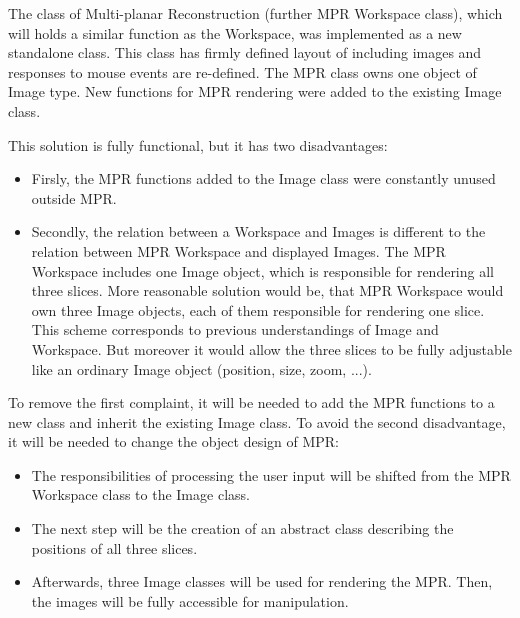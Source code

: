 The class of Multi-planar Reconstruction (further MPR Workspace class), which will holds a similar function as the Workspace, was implemented as a new standalone class. This class has firmly defined layout of including images and responses to mouse events are re-defined. The MPR class owns one object of Image type. New functions for MPR rendering were added to the existing Image class.

This solution is fully functional, but it has two disadvantages:

\begin{itemize}
\item Firsly, the MPR functions added to the Image class were constantly unused outside MPR.
\item Secondly, the relation between a Workspace and Images is different to the relation between MPR Workspace and displayed Images. The MPR Workspace includes one Image object, which is responsible for rendering all three slices. More reasonable solution would be, that MPR Workspace would own three Image objects, each of them responsible for rendering one slice. This scheme corresponds to previous understandings of Image and Workspace. But moreover it would allow the three slices to be fully adjustable like an ordinary Image object (position, size, zoom, ...). 
\end{itemize}

To remove the first complaint, it will be needed to add the MPR functions to a new class and inherit the existing Image class. To avoid the second disadvantage, it will be needed to change the object design of MPR:

\begin{itemize}
\item The responsibilities of processing the user input will be shifted from the MPR Workspace class to the Image class.
\item The next step will be the creation of an abstract class describing the positions of all three slices.
\item Afterwards, three Image classes will be used for rendering the MPR. Then, the images will be fully accessible for manipulation.
\end{itemize}



